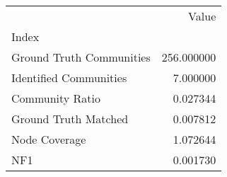 \begin{tabular}{lr}
\toprule
{} &       Value \\
Index                    &             \\
\midrule
Ground Truth Communities &  256.000000 \\
Identified Communities   &    7.000000 \\
Community Ratio          &    0.027344 \\
Ground Truth Matched     &    0.007812 \\
Node Coverage            &    1.072644 \\
NF1                      &    0.001730 \\
\bottomrule
\end{tabular}

